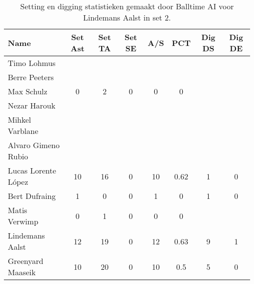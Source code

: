 \begin{table}[ht!]
  \centering
  \scriptsize
  \begin{tabular}{|l|c|c|c|c|c|c|c|} \hline
    \textbf{Name} & Set Ast & Set TA & Set SE & A/S & PCT & Dig DS & Dig DE \\ \hline
    Timo Lohmus &   &   &   &   &   &   &   \\
    Berre Peeters &   &   &   &   &   &   &   \\
    Max Schulz & 0 & 2 & 0 & 0 & 0 &   &   \\
    Nezar Harouk &   &   &   &   &   &   &   \\
    Mihkel Varblane &   &   &   &   &   &   &   \\
    Alvaro Gimeno Rubio &   &   &   &   &   &   &   \\
    Lucas Lorente López & 10 & 16 & 0 & 10 & 0.62 & 1 & 0 \\
    Bert Dufraing & 1 & 0 & 0 & 1 & 0 & 1 & 0 \\
    Matis Verwimp & 0 & 1 & 0 & 0 & 0 &   &   \\
    Lindemans Aalst & 12 & 19 & 0 & 12 & 0.63 & 9 & 1 \\
    Greenyard Maaseik & 10 & 20 & 0 & 10 & 0.5 & 5 & 0 \\ \hline
  \end{tabular}
  \caption[Setting en digging statistieken gemaakt door Balltime AI voor Lindemans Aalst in set 2]{\label{tab:PL3SetDigAalst2}Setting en digging statistieken gemaakt door Balltime AI voor Lindemans Aalst in set 2.}
\end{table}

